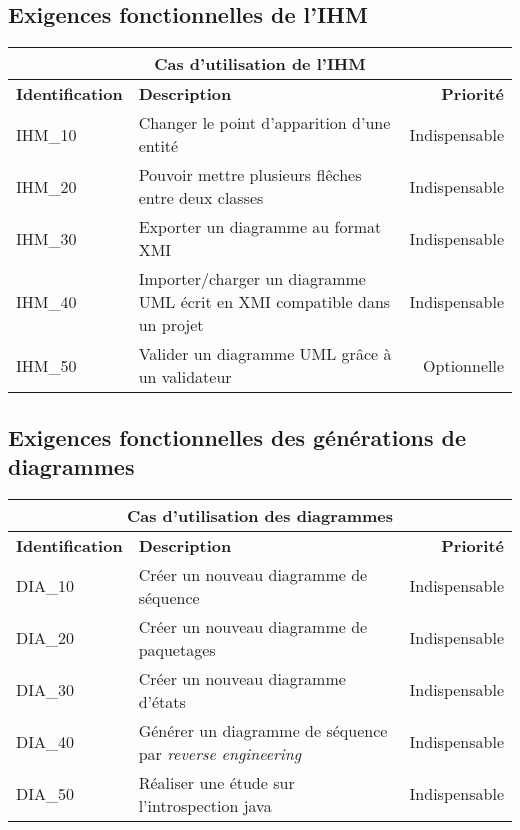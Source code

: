 \documentclass[hidelinks, 10pt,a4paper]{article}
\begin{document}
\subsection{Exigences fonctionnelles de l'IHM}
\begin{center}
    \begin{tabular}{|l|p{8cm}|r|}
        \hline\multicolumn{3}{|c|}{Cas d’utilisation de l'IHM} \\\hline
        {\textbf{Identification}} & {\textbf{Description}} & {\textbf{Priorité}} \\\hline
        {IHM\_10} & {Changer le point d'apparition d'une entité} & {Indispensable} \\\hline
        {IHM\_20} & {Pouvoir mettre plusieurs flêches entre deux classes} & {Indispensable} \\\hline
        {IHM\_30} & {Exporter un diagramme au format XMI} & {Indispensable} \\\hline
        {IHM\_40} & {Importer/charger un diagramme UML écrit en XMI compatible dans un projet} & {Indispensable} \\\hline
        {IHM\_50} & {Valider un diagramme UML grâce à un validateur} & {Optionnelle} \\\hline
    \end{tabular}
\end{center}

\subsection{Exigences fonctionnelles des générations de diagrammes}
\begin{center}
    \begin{tabular}{|l|p{8cm}|r|}
        \hline\multicolumn{3}{|c|}{Cas d’utilisation des diagrammes} \\\hline
        {\textbf{Identification}} & {\textbf{Description}} & {\textbf{Priorité}} \\\hline
        {DIA\_10} & {Créer un nouveau diagramme de séquence} & {Indispensable} \\\hline
        {DIA\_20} & {Créer un nouveau diagramme de paquetages} & {Indispensable} \\\hline
        {DIA\_30} & {Créer un nouveau diagramme d’états} & {Indispensable} \\\hline
        {DIA\_40} & {Générer un diagramme de séquence par \textit{reverse engineering}} & {Indispensable} \\\hline
        {DIA\_50} & {Réaliser une étude sur l'introspection java} & {Indispensable} \\\hline
    \end{tabular}
\end{center}
\end{document}

